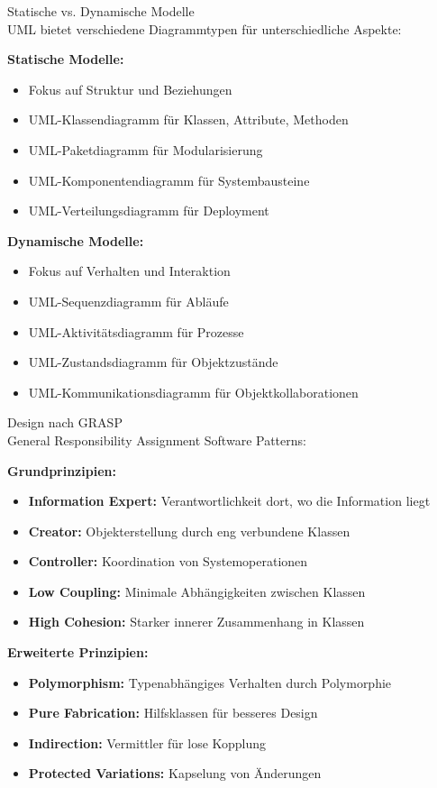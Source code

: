 \begin{concept}{Statische vs. Dynamische Modelle}\\
UML bietet verschiedene Diagrammtypen für unterschiedliche Aspekte:

\textbf{Statische Modelle:}
\begin{itemize}
    \item Fokus auf Struktur und Beziehungen
    \item UML-Klassendiagramm für Klassen, Attribute, Methoden
    \item UML-Paketdiagramm für Modularisierung
    \item UML-Komponentendiagramm für Systembausteine
    \item UML-Verteilungsdiagramm für Deployment
\end{itemize}

\textbf{Dynamische Modelle:}
\begin{itemize}
    \item Fokus auf Verhalten und Interaktion
    \item UML-Sequenzdiagramm für Abläufe
    \item UML-Aktivitätsdiagramm für Prozesse
    \item UML-Zustandsdiagramm für Objektzustände
    \item UML-Kommunikationsdiagramm für Objektkollaborationen
\end{itemize}
\end{concept}

\begin{concept}{Design nach GRASP}\\
General Responsibility Assignment Software Patterns:

\textbf{Grundprinzipien:}
\begin{itemize}
    \item \textbf{Information Expert:} Verantwortlichkeit dort, wo die Information liegt
    \item \textbf{Creator:} Objekterstellung durch eng verbundene Klassen
    \item \textbf{Controller:} Koordination von Systemoperationen
    \item \textbf{Low Coupling:} Minimale Abhängigkeiten zwischen Klassen
    \item \textbf{High Cohesion:} Starker innerer Zusammenhang in Klassen
\end{itemize}

\textbf{Erweiterte Prinzipien:}
\begin{itemize}
    \item \textbf{Polymorphism:} Typenabhängiges Verhalten durch Polymorphie
    \item \textbf{Pure Fabrication:} Hilfsklassen für besseres Design
    \item \textbf{Indirection:} Vermittler für lose Kopplung
    \item \textbf{Protected Variations:} Kapselung von Änderungen
\end{itemize}
\end{concept}

